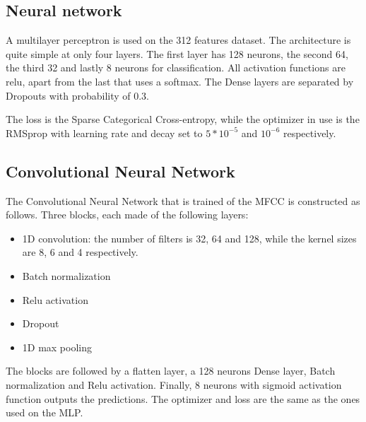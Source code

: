 \subsection{Neural network}

A multilayer perceptron is used on the 312 features dataset. 
The architecture is quite simple at only four layers.
The first layer has 128 neurons, the second 64, the third 32 and lastly 8 
neurons for classification. 
All activation functions are relu, apart from the last that uses 
a softmax.
The Dense layers are separated by Dropouts with probability of 0.3.

The loss is the Sparse Categorical Cross-entropy, while the 
optimizer in use is the RMSprop with learning rate and decay
set to $5* 10^{-5}$ and $10^{-6}$ respectively.

\subsection{Convolutional Neural Network}

The Convolutional Neural Network that is trained of the MFCC is 
constructed as follows. 
Three blocks, each made of the following layers: 
\begin{itemize}
  \item 1D convolution: the number of filters is 32, 64 and 128, while the 
  kernel sizes are 8, 6 and 4 respectively.
  \item Batch normalization
  \item Relu activation
  \item Dropout
  \item 1D max pooling
\end{itemize}
The blocks are followed by a flatten layer, a 128 neurons Dense layer, 
Batch normalization and Relu activation. 
Finally, 8 neurons with sigmoid activation function outputs the predictions.
The optimizer and loss are the same as the ones used on the MLP.